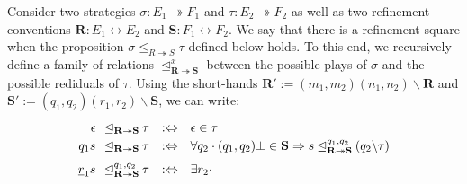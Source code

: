 \documentclass[acmsmall,screen,review,anonymous,nonacm]{acmart}
\begin{document}
\begin{definition}
Consider two strategies
$\sigma : E_1 \twoheadrightarrow F_1$ and
$\tau : E_2 \twoheadrightarrow F_2$
as well as two refinement conventions
$\mathbf{R} : E_1 \leftrightarrow E_2$ and
$\mathbf{S} : F_1 \leftrightarrow F_2$.
We say that there is a refinement square
when the proposition
$\sigma \le_{R \twoheadrightarrow S} \tau$
defined below holds.
%
To this end,
we recursively define a family of relations
$\unlhd^x_{\mathbf{R} \twoheadrightarrow \mathbf{S}}$
between the possible plays of $\sigma$
and the possible rediduals of $\tau$.
Using the short-hands 
$\mathbf{R}' := (m_1,m_2)(n_1,n_2) \backslash \mathbf{R}$ and
$\mathbf{S}' := (q_1,q_2)(r_1,r_2) \backslash \mathbf{S}$,
we can write:
\[
\def\arraystretch{1.2}
\begin{array}{r@{\:\:\:}l@{\:}l@{\quad:\Leftrightarrow\quad}l}
  \epsilon &
  \unlhd_{\mathbf{R} \twoheadrightarrow \mathbf{S}} &
  \tau &
    \epsilon \in \tau
  \\
  q_1 s &
  \unlhd_{\mathbf{R} \twoheadrightarrow \mathbf{S}} &
  \tau &
    \forall q_2 \cdot
      (q_1, q_2)\bot \in \mathbf{S} \Rightarrow
      s \unlhd_{\mathbf{R} \twoheadrightarrow \mathbf{S}}^{q_1,q_2}
      (q_2 \backslash \tau)
  \\[1ex]
  \underline{r}_1 s &
  \unlhd_{\mathbf{R} \twoheadrightarrow \mathbf{S}}^{q_1,q_2} &
  \tau &
    \exists r_2 \cdot

\end{array}\]
\end{definition}
\end{document}
